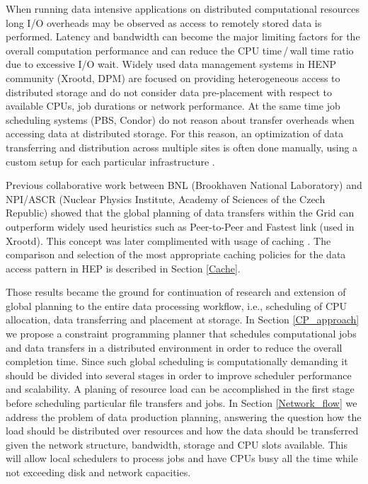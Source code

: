 \documentclass[english]{ddny}
\begin{document}
When running data intensive applications on distributed computational resources long I/O overheads may be observed as access to remotely stored data is performed. Latency and bandwidth can become the major limiting factors for the overall computation performance and can reduce the CPU time\,/\,wall time ratio due to excessive I/O wait.  Widely used data management systems in HENP community (Xrootd, DPM) are focused on providing heterogeneous access to distributed storage and do not consider data pre-placement with respect to available CPUs, job durations or network performance. At the same time job scheduling systems (PBS, Condor) do not reason about transfer overheads when accessing data at distributed storage. For this reason, an optimization of data transferring and distribution across multiple sites is often done manually, using a custom setup for each particular infrastructure \cite{Balewski}.

Previous collaborative work between BNL (Brookhaven National Laboratory) and NPI/ASCR (Nuclear Physics Institute, Academy of Sciences of the Czech Republic) showed that the global planning of data transfers within the Grid can outperform widely used heuristics such as Peer-to-Peer and Fastest link (used in Xrootd)\cite{Zerola}. This concept was later complimented with usage of caching \cite{Makatun_cache}. The comparison and selection of the most appropriate caching policies for the data access pattern in HEP is described in Section \ref{Cache}. 
 
Those results became the ground for continuation of research and extension of global planning to the entire data processing workflow, i.e., scheduling of CPU allocation, data transferring and  placement at storage. In Section \ref{CP_approach} we propose a constraint programming planner that schedules computational jobs and data transfers in a distributed environment in order to reduce the overall completion time. Since such global scheduling is computationally demanding it should be divided into several stages in order to improve scheduler performance and scalability. A planing of resource load can be accomplished in the first stage before scheduling particular file transfers and jobs. In Section \ref{Network_flow} we address the problem of data production planning, answering the question how the load should be distributed over resources and how the data should be transferred given the network structure, bandwidth, storage and CPU slots available. This will allow local schedulers to process jobs and have CPUs busy all the time while not exceeding disk and network capacities.
\end{document}
